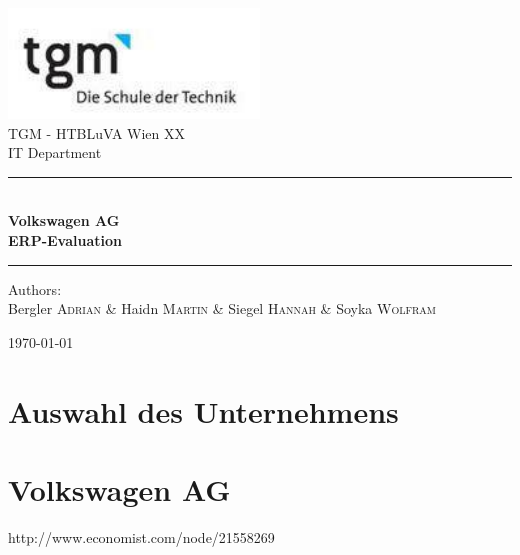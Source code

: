 \documentclass[12pt]{article}
\begin{document}
\begin{titlepage}
\begin{center}
\includegraphics[width=0.5\textwidth]{images/logo}\\[1cm]    

\LARGE TGM - HTBLuVA Wien XX \\ IT Department  \\[1.5cm]

\rule{1.0\textwidth}{1mm}
{ \huge \bfseries \\[0.4cm]  \huge Volkswagen AG \\ \LARGE ERP-Evaluation \\[0.4cm] }

\rule{1.0\textwidth}{1mm}



\noindent 
\vspace{5cm}

\begin{center}
\large
Authors: \\ 
Bergler \textsc{Adrian} \&
Haidn \textsc{Martin} \&
Siegel \textsc{Hannah} \&
Soyka \textsc{Wolfram}
\end{center}

\vfill

{\large \today}

\end{center}
\end{titlepage}

\tableofcontents


\ohead{\headmark}

\newpage

\section{Auswahl des Unternehmens}

\section{Volkswagen AG}
http://www.economist.com/node/21558269
\end{document}
